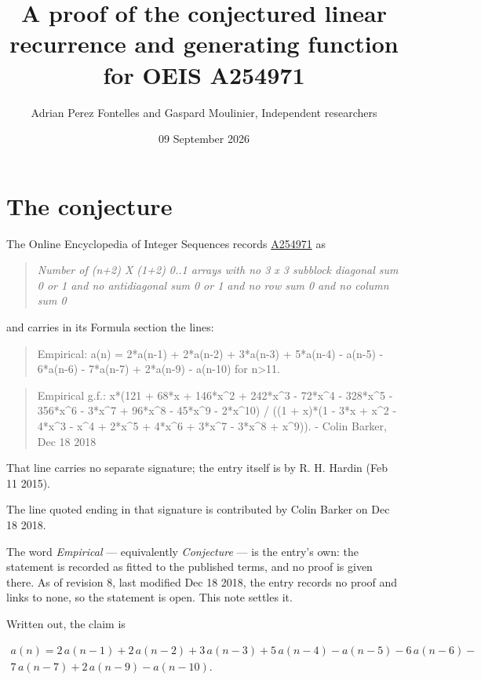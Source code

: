 \documentclass[11pt]{article}
\title{A proof of the conjectured linear recurrence and generating function for OEIS A254971}
\author{Adrian Perez Fontelles and Gaspard Moulinier, Independent researchers}
\date{09 September 2026}
\theoremstyle{definition}
\begin{document}
\maketitle
\section{The conjecture}

The Online Encyclopedia of Integer Sequences records \href{https://oeis.org/A254971}{A254971} as

\begin{quote}\itshape Number of (n+2) X (1+2) 0..1 arrays with no 3 x 3 subblock diagonal sum 0 or 1 and no antidiagonal sum 0 or 1 and no row sum 0 and no column sum 0\end{quote}

and carries in its Formula section the lines:

\begin{quote}\ttfamily Empirical: a(n) = 2*a(n-1) + 2*a(n-2) + 3*a(n-3) + 5*a(n-4) - a(n-5) - 6*a(n-6) - 7*a(n-7) + 2*a(n-9) - a(n-10) for n>11.\end{quote}

\begin{quote}\ttfamily Empirical g.f.: x*(121 + 68*x + 146*x\textasciicircum{}2 + 242*x\textasciicircum{}3 - 72*x\textasciicircum{}4 - 328*x\textasciicircum{}5 - 356*x\textasciicircum{}6 - 3*x\textasciicircum{}7 + 96*x\textasciicircum{}8 - 45*x\textasciicircum{}9 - 2*x\textasciicircum{}10) / ((1 + x)*(1 - 3*x + x\textasciicircum{}2 - 4*x\textasciicircum{}3 - x\textasciicircum{}4 + 2*x\textasciicircum{}5 + 4*x\textasciicircum{}6 + 3*x\textasciicircum{}7 - 3*x\textasciicircum{}8 + x\textasciicircum{}9)). - Colin Barker, Dec 18 2018\end{quote}

That line carries no separate signature; the entry itself is by R. H. Hardin (Feb 11 2015).

The line quoted ending in that signature is contributed by Colin Barker on Dec 18 2018.

The word {\itshape Empirical} --- equivalently {\itshape Conjecture} --- is the entry's own: the statement is recorded as fitted to the published terms, and no proof is given there. As of revision 8, last modified Dec 18 2018, the entry records no proof and links to none, so the statement is open. This note settles it.

Written out, the claim is

\begin{multline*} a(n) = 2\,a(n-1) + 2\,a(n-2) + 3\,a(n-3) + 5\,a(n-4) - a(n-5) - 6\,a(n-6) - \\ 7\,a(n-7) + 2\,a(n-9) - a(n-10). \end{multline*}
\end{document}
